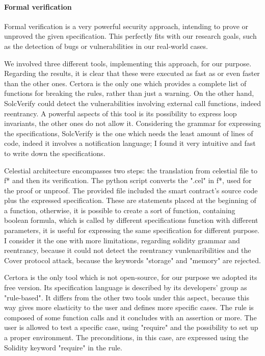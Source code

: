 \paragraph{Formal verification} 
Formal verification is a very powerful security approach, intending to prove or unproved the given specification. 
This perfectly fits with our research goals, such as the detection of bugs or vulnerabilities in our real-world cases. 

We involved three different tools, implementing this approach, for our purpose. Regarding the results, it is clear that these were executed as fast as or even faster than the other ones. 
Certora is the only one which provides a complete list of functions for breaking the rules, rather than just a warning. 
On the other hand, SolcVerify could detect the vulnerabilities involving external call functions, indeed reentrancy. A powerful aspects of this tool is its possibility to express 
loop invariants, the other ones do not allow it.
Considering the grammar for expressing the specifications, SolcVerify is the one which needs the least amount of lines of code, indeed it involves a notification language; 
I found it very intuitive and fast to write down the specifications.

Celestial architecture encompasses two steps: the translation from celestial file to f* and then its verification. The python script converts the ".cel" in f*, used for the proof or unproof.
The provided file included the smart contract's source code plus the expressed specification. These are statements placed at the beginning of a function, otherwise, it is possible to create a sort of function, 
containing boolean formula, which is called by different specifications function with different parameters, it is useful for expressing the same specification for different purpose.  I consider it the one with more limitations, regarding solidity grammar and reentrancy, 
because it could not detect the reentrancy vunlenaribilities and the Cover protocol attack, because the keywords "storage" and "memory" are rejected. 

Certora is the only tool which is not open-source, for our purpose we adopted its free version.
Its specification language is described by its developers' group as "rule-based". It differs from the other two tools under this aspect, because this way gives more elasticity to the user and defines more specific cases.
The rule is composed of some function calls and it concludes with an assertion or more. The user is allowed to test a specific case, using "require" and the possibility to set up a proper environment. 
The preconditions, in this case, are expressed using the Solidity keyword "require" in the rule.

